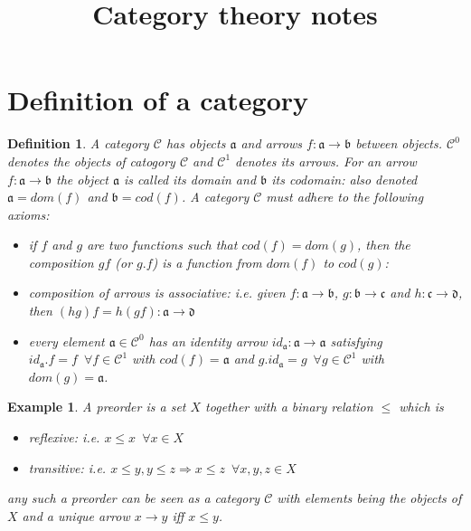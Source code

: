 \documentclass{article}
\newcommand{\cat}[1]{\mathcal{#1}} %
\newcommand{\cato}[1]{\cat{#1}^0} %
\newcommand{\catm}[1]{\cat{#1}^1} %
\newcommand{\ob}[1]{\mathfrak{#1}} %
\newcommand{\all}{\enspace \forall}
\newcommand{\allin}[2]{\all #1 \in #2}
\newtheorem{definition}[theorem]{Definition}
\newtheorem{example}[theorem]{Example}
\begin{document}
\title {Category theory notes}
\maketitle

\section{Definition of a category}
\begin{definition}
	A category $\cat{C}$ has objects $\ob{a}$ and arrows $f: \ob{a} \rightarrow \ob{b}$ between objects.
	$\cato{C}$ denotes the objects of catogory $\cat{C}$ and $\catm{C}$ denotes its arrows.
	For an arrow $f: \ob{a} \rightarrow \ob{b}$ the object $\ob{a}$ is called its domain and $\ob{b}$ its codomain: also denoted $\ob{a} = dom(f)$ and $\ob{b} = cod(f)$.
	A category $\cat{C}$ must adhere to the following \emph{axioms}:
	\begin{itemize}
		\item if $f$ and $g$ are two functions such that $cod(f)=dom(g)$, then the composition $gf$ (or $g.f$) is a function from $dom(f)$ to $cod(g)$:
	
		\item composition of arrows is \emph{associative}: i.e. given $f: \ob{a} \rightarrow \ob{b}$, $g: \ob{b} \rightarrow \ob{c}$ and $h: \ob{c} \rightarrow \ob{d}$, then $(hg)f = h(gf): \ob{a} \rightarrow \ob{d}$
		\item every element $\ob{a} \in \cato{C}$ has an identity arrow $id_{\ob{a}}: \ob{a} \rightarrow \ob{a}$ satisfying $id_{\ob{a}}.f = f \allin{f}{\catm{C}}$ with $cod(f)=\ob{a}$ and 
		$g.id_{\ob{a}} = g \allin{g}{\catm{C}}$ with $dom(g)=\ob{a}$.
	\end{itemize}
\end{definition}


\begin{example}

	A \emph{preorder} is a set $X$ together with a binary relation $\leq$ which is 
	\begin{itemize}
		\item reflexive: i.e. $x \leq x \allin{x}{X} $
		\item transitive: i.e. $x \leq y, y \leq z \Rightarrow x \leq z \allin{x,y,z}{X}$
	\end{itemize}
	any such a preorder can be seen as a category $\cat{C}$ with elements being the objects of $X$ and a unique arrow $x \rightarrow y$ iff $x \leq y$.

\end{example}
\end{document}
